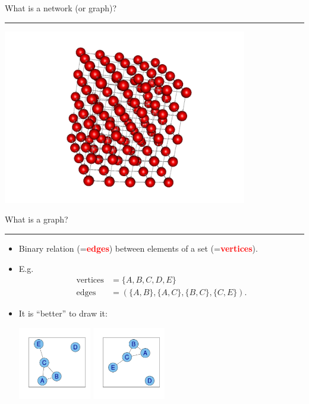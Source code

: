 \documentclass[landscape,fleqno]{foils}
\newcommand{\cstitle}[1]{{\centering\color{blue}\Large #1\par\vspace*{10pt}\hrule}}
\renewcommand{\emph}[1]{\textcolor{red}{\bf #1}}
\begin{document}
\newpage
\cstitle{What is a network (or graph)?}
\begin{center}
\includegraphics[width=0.8\textwidth]{3dplot}
\end{center}

\newpage
\cstitle{What is a graph?}
\begin{itemize}
\item Binary relation (=\emph{edges}) between elements of a set
  (=\emph{vertices}). \pause\\[-15pt]
\item E.g. 
  \begin{align} 
    \text{vertices} & =\{A,B,C,D,E\} \nonumber\\
    \text{edges}    & =( \{A,B\},\{A,C\},\{B,C\}, \{C,E\} ). \nonumber
  \end{align} \pause
\item It is ``better'' to draw it:
  \begin{center}
    \includegraphics[width=0.25\textwidth]{small1} \pause
    \includegraphics[width=0.25\textwidth]{small2}
  \end{center}
\end{itemize}
\end{document}
